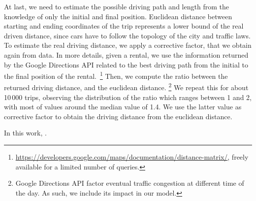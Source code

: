 At last, we need to estimate the possible driving path and length from the knowledge of only the initial and final position. Euclidean distance between starting and ending coordinates of the trip represents a lower bound of the real driven distance, since cars have to follow the topology of the city and traffic laws. To estimate the real driving distance, we apply a corrective factor, that we obtain again from data. In more details, given a rental, we use the information returned by the Google Directions API related to the best driving path from the  initial to the final position of the rental.~\footnote{\url{https://developers.google.com/maps/documentation/distance-matrix/}, freely available for a limited number of queries.} Then, we compute the ratio between the returned driving distance, and the euclidean distance. \footnote{Google Directions API factor eventual traffic congestion at different time of the day. As such, we include its impact in our model.}
We repeat this for about 10\,000 trips, observing the distribution of the ratio which ranges between 1 and 2, with most of values around the median value of 1.4. We use the latter value as corrective factor to obtain the driving distance from the euclidean distance.

In this work, .





